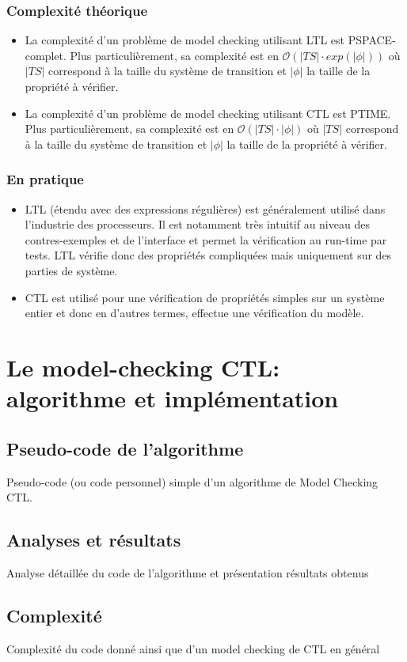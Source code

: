 \documentclass[runningheads,a4paper,10pt]{llncs}
\begin{document}
\newpage
\subsubsection{Complexité théorique}
\begin{itemize}
\item La complexité d'un problème de model checking utilisant LTL est PSPACE-complet. Plus particulièrement, sa complexité est en $\mathcal{O}(|TS| \cdot exp(|\phi|))$ où $|TS|$ correspond à la taille du système de transition et $|\phi|$ la taille de la propriété à vérifier. 
\item La complexité d'un problème de model checking utilisant CTL est PTIME. Plus particulièrement, sa complexité est en $\mathcal{O}(|TS| \cdot |\phi|)$ où $|TS|$ correspond à la taille du système de transition et $|\phi|$ la taille de la propriété à vérifier. 
\end{itemize}


\subsubsection{En pratique}
\begin{itemize}
\item LTL (étendu avec des expressions régulières) est généralement utilisé dans l'industrie des processeurs. Il est notamment très intuitif au niveau des contres-exemples et de l'interface et permet la vérification au run-time par tests. LTL vérifie donc des propriétés compliquées mais uniquement sur des parties de système. 
\item CTL est utilisé pour une vérification de propriétés simples sur un système entier et donc en d'autres termes, effectue une vérification du modèle. 
\end{itemize}




\section{Le model-checking CTL: algorithme et implémentation}
\subsection{Pseudo-code de l'algorithme}
Pseudo-code (ou code personnel) simple d'un algorithme de Model Checking CTL.

\subsection{Analyses et résultats}
Analyse détaillée du code de l'algorithme et présentation résultats obtenus 

\subsection{Complexité}
Complexité du code donné ainsi que d'un model checking de CTL en général \\ 



\nocite{*}

\end{document}
